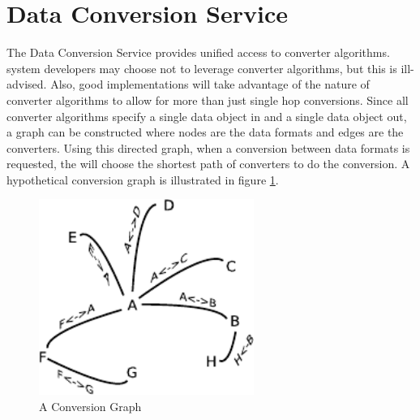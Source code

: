 \section{Data Conversion Service}

The Data Conversion Service provides unified access to converter algorithms.
 system developers may choose not to leverage
converter algorithms, but this is ill-advised. Also, good implementations will
take advantage of the nature of converter algorithms to allow for more than just
single hop conversions. Since all converter algorithms specify a single data
object in and a single data object out, a graph can be constructed where nodes
are the data formats and edges are the converters. Using this directed graph,
when a conversion between data formats is requested, the
 will choose the shortest path of converters to do
the conversion. A hypothetical conversion graph is illustrated in figure
\ref{fig:conversionGraph}.

\begin{figure}[h!]
\centering
\includegraphics[width=70mm]{../img/conversionGraph.pdf}
\caption{A Conversion Graph}
\label{fig:conversionGraph}
\end{figure}

\orgcishellserviceconversion{}